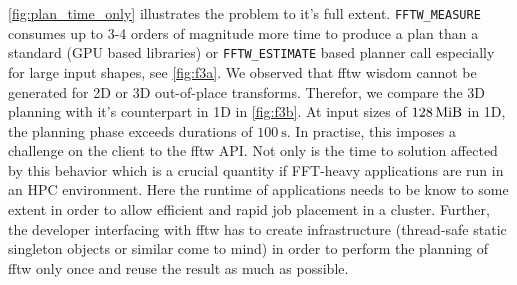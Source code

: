 \cref{fig:plan_time_only} illustrates the problem to it's full extent. \texttt{FFTW\_MEASURE} consumes up to 3-4 orders of magnitude more time to produce a plan than a standard (GPU based libraries) or \texttt{FFTW\_ESTIMATE} based planner call especially for large input shapes, see \cref{fig:f3a}. We observed that fftw wisdom cannot be generated for 2D or 3D out-of-place transforms. Therefor, we compare the 3D planning with it's counterpart in 1D in \cref{fig:f3b}. At input sizes of $\SI{128}{\mebi\byte}$ in 1D, the planning phase exceeds durations of $\SI{100}{\s}$. In practise, this imposes a challenge on the client to the fftw API. Not only is the time to solution affected by this behavior which is a crucial quantity if FFT-heavy applications are run in an HPC environment. Here the runtime of applications needs to be know to some extent in order to allow efficient and rapid job placement in a cluster. Further, the developer interfacing with fftw has to create infrastructure (thread-safe static singleton objects or similar come to mind) in order to perform the planning of fftw only once and reuse the result as much as possible.



